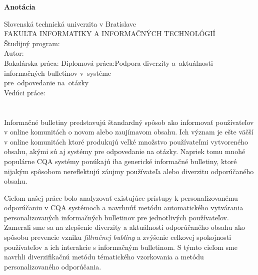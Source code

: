 \newpage
\thispagestyle{plain}
\begin{center}
\begin{Large}
\textbf{Anotácia} \\
\end{Large}
\end{center}
Slovenská technická univerzita v Bratislave
\vspace*{2mm}\\FAKULTA INFORMATIKY A INFORMAČNÝCH TECHNOLÓGIÍ
\vspace*{2mm}\\
\noindent
Študijný program:~\Program
\vspace*{2mm}\\
\noindent
Autor:\hspace*{21mm}\Author
\vspace*{2mm}\\
{
	{Bakalárska práca: }\Title
}
{
	{Diplomová práca:\hspace*{2mm}}Podpora diverzity a~aktuálnosti informačných bulletinov v~systéme\\
    \hspace*{32mm}pre~odpovedanie na~otázky
}
\vspace*{2mm}\\
Vedúci práce:\hspace*{9mm}\Supervisor
\vspace*{2mm}\\\Month \Year \\
\noindent
\\
Informačné bulletiny predstavujú štandardný spôsob ako informovať používateľov v online komunitách o novom alebo zaujímavom
obsahu. Ich význam je ešte väčší v online komunitách ktoré produkujú veľké množstvo používateľmi vytvoreného obsahu,
akými sú aj systémy pre odpovedanie na otázky.
Napriek tomu mnohé populárne CQA systémy ponúkajú iba generické informačné bulletiny, ktoré nijakým spôsobom nereflektujú
záujmy používateľa alebo diverzitu odporúčaného obsahu.

Cieľom našej práce bolo analyzovať existujúce prístupy k personalizovanému odporúčaniu v CQA systémoch a navrhnúť metódu
automatického vytvárania personalizovaných informačných bulletinov pre jednotlivých používateľov. Zamerali sme sa na zlepšenie
diverzity a aktuálnosti odporúčaného obsahu ako spôsobu prevencie vzniku \emph{filtračnej bubliny} a zvýšenie celkovej
spokojnosti používateľov a ich interakcie s informačným bulletinom. S týmto cieľom sme navrhli diverzifikačnú metódu
tématického vzorkovania a metódu personalizovaného odporúčania.

